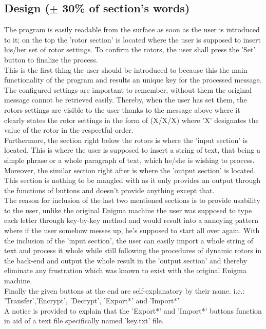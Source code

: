 \documentclass[conference,compsoc]{IEEEtran}
\begin{document}
\subsection{Design ($\pm$ 30\% of section's words)}
The program is easily readable from the surface as soon as the user is introduced to it; on the top the 'rotor section' is located where the user is supposed to insert his/her set of rotor settings. To confirm the rotors, the user shall press the 'Set' button to finalize the process.\\
This is the first thing the user should be introduced to because this the main functionality of the program and results an unique key for the processed message. The configured settings are important to remember, without them the original message cannot be retrieved easily. Thereby, when the user has set them, the rotors settings are visible to the user thanks to the message above where it clearly states the rotor settings in the form of (X/X/X) where 'X' designates the value of the rotor in the respectful order.\\

Furthermore, the section right below the rotors is where the 'input section' is located. This is where the user is supposed to insert a string of text, that being a simple phrase or a whole paragraph of text, which he/she is wishing to process.\\

Moreover, the similar section right after is where the 'output section' is located. This section is nothing to be mangled with as it only provides an output through the functions of buttons and doesn't provide anything except that.\\

The reason for inclusion of the last two mentioned sections is to provide usability to the user, unlike the original Enigma machine the user was supposed to type each letter through key-by-key method and would result into a annoying pattern where if the user somehow messes up, he's supposed to start all over again. With the inclusion of the 'input section', the user can easily import a whole string of text and process it whole while still following the procedures of dynamic rotors in the back-end and output the whole result in the 'output section' and thereby eliminate any frustration which was known to exist with the original Enigma machine.\\

Finally the given buttons at the end are self-explanatory by their name. i.e.: 'Transfer','Encrypt', 'Decrypt', 'Export*' and 'Import*'\\
A notice is provided to explain that the 'Export*' and 'Import*' buttons function in aid of a text file specifically named 'key.txt' file.\\
\end{document}
